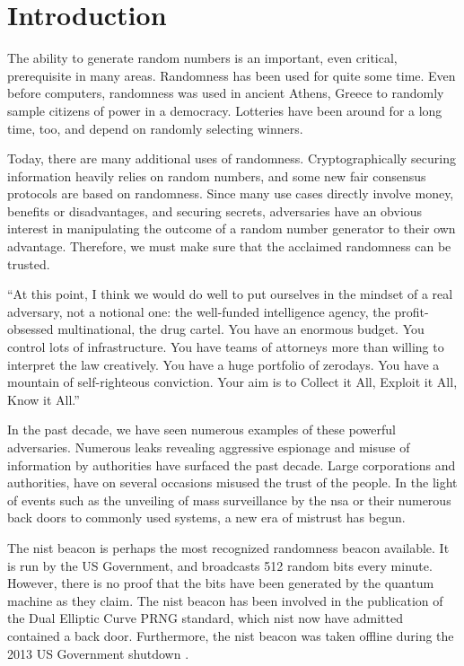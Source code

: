 \section{Introduction}\label{cha:introduction}

The ability to generate random numbers is an important, even critical, prerequisite in many areas. Randomness has been used for quite some time.
Even before computers, randomness was used in ancient Athens, Greece to randomly sample citizens of power in a democracy.
Lotteries have been around for a long time, too, and depend on randomly selecting winners.

Today, there are many additional uses of randomness.
Cryptographically securing information heavily relies on random numbers, and some new fair consensus protocols are based on randomness.
Since many use cases directly involve money, benefits or disadvantages, and securing secrets, adversaries have an obvious interest in manipulating the outcome of a random number generator to their own advantage.
Therefore, we must make sure that the acclaimed randomness can be trusted.

\begin{displayquote}
    \enquote{At this point, I think we would do well to put ourselves in the mindset of a real adversary, not a notional one:
    the well-funded intelligence agency, the profit-obsessed multinational, the drug cartel.
    You have an enormous budget. You control lots of infrastructure.
    You have teams of attorneys more than willing to interpret the law creatively.
    You have a huge portfolio of zerodays. You have a mountain of self-righteous conviction.
    Your aim is to Collect it All, Exploit it All, Know it All.}
\end{displayquote}

In the past decade, we have seen numerous examples of these powerful adversaries.
Numerous leaks revealing aggressive espionage and misuse of information by authorities have surfaced the past decade.
Large corporations and authorities, have on several occasions misused the trust of the people.
In the light of events such as the unveiling of mass surveillance by the \gls{nsa} or their numerous back doors to commonly used systems, a new era of mistrust has begun.

The \gls{nist} beacon is perhaps the most recognized randomness beacon available. It is run by the US Government, and broadcasts 512 random bits every minute. However, there is no proof that the bits have been generated by the quantum machine as they claim. The \gls{nist} beacon has been involved in the publication of the Dual Elliptic Curve PRNG standard, which \gls{nist} now have admitted contained a back door. Furthermore, the \gls{nist} beacon was taken offline during the 2013 US Government shutdown .

